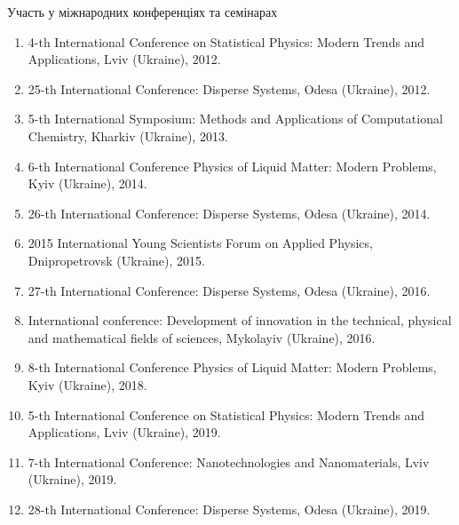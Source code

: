 \documentclass[10pt]{beamer}
\begin{document}
\begin{frame}{Участь у міжнародних конференціях та семінарах}
\vspace{-5pt}
{\footnotesize
\begin{enumerate}
\item 4-th International Conference on Statistical
Physics: Modern Trends and Applications, Lviv (Ukraine), 2012.

\item 25-th International
Conference: Disperse Systems, Odesa (Ukraine), 2012.

\item 5-th International Symposium: Methods and
Applications of Computational Chemistry,  Kharkiv (Ukraine), 2013.

\item 6-th International
Conference Physics  of  Liquid  Matter:  Modern Problems,
 Kyiv (Ukraine), 2014.

\item 26-th International
Conference: Disperse Systems,  Odesa (Ukraine), 2014.

\item 2015 International Young
Scientists Forum on Applied Physics,  Dnipropetrovsk (Ukraine), 2015.

\item 27-th International
Conference: Disperse Systems, Odesa (Ukraine), 2016.

\item International conference: Development of innovation in the
technical, physical and mathematical fields of sciences, Mykolayiv (Ukraine), 2016.

\item 8-th International  Conference Physics  of  Liquid  Matter:
Modern Problems, Kyiv (Ukraine), 2018.

\item 5-th International Conference on Statistical
Physics: Modern Trends and Applications, Lviv (Ukraine), 2019.

\item 7-th International Conference: Nano\-technologies 
and Nanomaterials,  Lviv (Ukraine), 2019.

\item 28-th International
Conference: Disperse Systems, Odesa (Ukraine), 2019.
\end{enumerate}
}

\end{frame}
\end{document}
